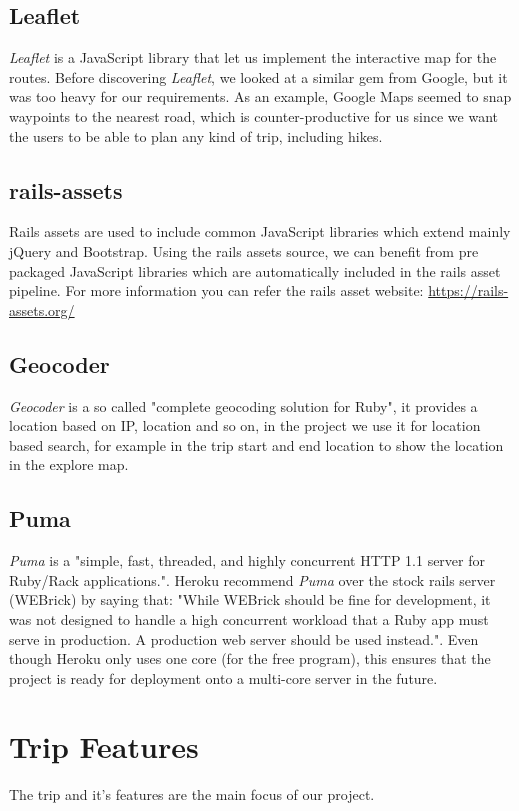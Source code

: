 \documentclass[a4paper]{article}
\begin{document}
\subsection{Leaflet}
\textit{Leaflet}\cite{leaflet} is a JavaScript library that let us implement the interactive map for the routes. Before discovering \textit{Leaflet}, we looked at a similar gem from Google, but it was too heavy for our requirements. As an example, Google Maps seemed to snap waypoints to the nearest road, which is counter-productive for us since we want the users to be able to plan any kind of trip, including hikes.

\subsection{rails-assets}
Rails assets are used to include common JavaScript libraries which extend mainly jQuery and Bootstrap. Using the rails assets source, we can benefit from pre packaged JavaScript libraries which are automatically included in the rails asset pipeline. For more information you can refer the rails asset website: \url{https://rails-assets.org/}

\subsection{Geocoder}
\textit{Geocoder} is a so called "complete geocoding solution for Ruby"\cite{geocoder}, it provides a location based on IP, location and so on, in the project we use it for location based search, for example in the trip start and end location to show the location in the explore map. 

\subsection{Puma}
\textit{Puma} is a "simple, fast, threaded, and highly concurrent HTTP 1.1 server for Ruby/Rack applications."\cite{puma}. Heroku recommend \textit{Puma} over the stock rails server (WEBrick) by saying that: "While WEBrick should be fine for development, it was not designed to handle a high concurrent workload that a Ruby app must serve in production. A production web server should be used instead."\cite{heroku_webserver}. Even though Heroku only uses one core (for the free program), this ensures that the project is ready for deployment onto a multi-core server in the future.  


\section{Trip Features}
The trip and it's features are the main focus of our project. 
\end{document}
